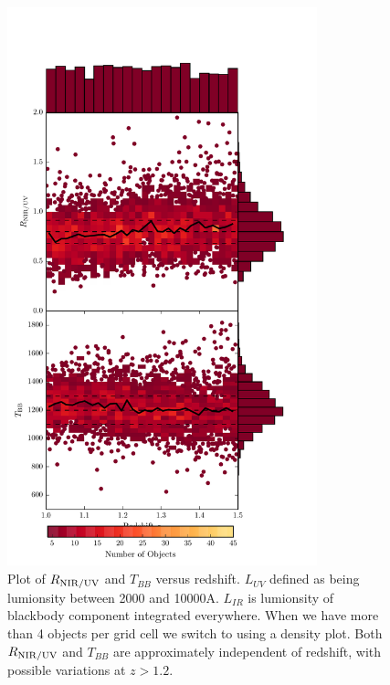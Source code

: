 \begin{figure}
  \centering
  \includegraphics[width=0.8\textwidth]{figures/chapter06/ratio_bbt_z.pdf}
  \caption{Plot of $R_{{\rm NIR}/{\rm UV}}$ and $T_{BB}$ versus redshift. $L_{UV}$ defined as being lumionsity between 2000 and 10000A. $L_{IR}$ is lumionsity of blackbody component integrated everywhere. When we have more than 4 objects per grid cell we switch to using a density plot. Both $R_{{\rm NIR}/{\rm UV}}$ and $T_{BB}$ are approximately independent of redshift, with possible variations at $z > 1.2$.}
  \label{fig:}
\end{figure}


